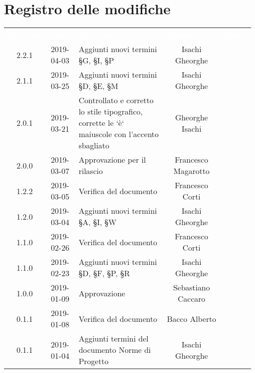
\section*{Registro delle modifiche}
{
	\renewcommand{\arraystretch}{1.5}
	\centering
	\begin{longtable}{ c c  C{4cm}  c  c }
		
		\textcolor{white}{\textbf{Versione}} & \textcolor{white}{\textbf{Data}} & \textcolor{white}{\textbf{Descrizione}} & \textcolor{white}{\textbf{Nominativo}} & \textcolor{white}{\textbf{Ruolo}}\\
		
		2.2.1 & 2019-04-03 & Aggiunti nuovi termini \S{G}, \S{I}, \S{P} & Isachi Gheorghe &\reda{}\\
		2.1.1 & 2019-03-25 & Aggiunti nuovi termini  \S{D}, \S{E}, \S{M} & Isachi Gheorghe &\reda{}\\

		2.0.1 & 2019-03-21 & Controllato e corretto lo stile tipografico, corrette le `è` maiuscole con l'accento sbagliato &  Gheorghe Isachi & \reda{}\\			
		
		2.0.0 & 2019-03-07 & Approvazione per il rilascio &  Francesco Magarotto & \Res{}\\	

		1.2.2 & 2019-03-05 & Verifica del documento &  Francesco Corti & \ver{}\\		
		
		1.2.0 & 2019-03-04 & Aggiunti nuovi termini \S{A}, \S{I}, \S{W} & Isachi Gheorghe &\reda{}\\
		
		1.1.0 & 2019-02-26 & Verifica del documento &  Francesco Corti & \ver{}\\
		
		1.1.0 & 2019-02-23 & Aggiunti nuovi termini  \S{D}, \S{F}, \S{P}, \S{R} & Isachi Gheorghe &\reda{}\\
		
		1.0.0 & 2019-01-09 & Approvazione & Sebastiano Caccaro & \Res{}\\
						
		0.1.1 & 2019-01-08 & Verifica del documento & Bacco Alberto & \ver{}\\
		
		0.1.1 & 2019-01-04 & Aggiunti termini del documento Norme di Progetto & Isachi Gheorghe &\reda{}\\
		

\end{longtable}}
